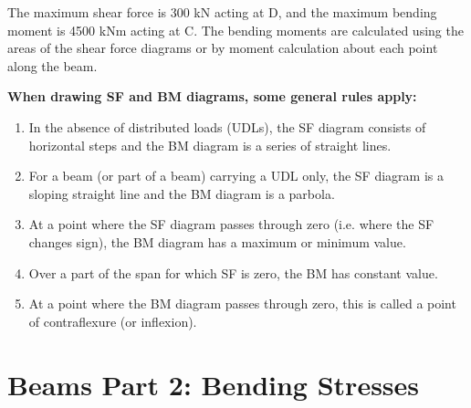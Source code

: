 \documentclass[12pt, letterpaper, twoside]{article}
\begin{document}
\begin{center}
\end{center}

\bigskip

The maximum shear force is 300 kN acting at D, and the maximum bending moment is 4500 kNm acting at C.  The bending moments are calculated using the areas of the shear force diagrams or by moment calculation about each point along the beam.
\bigskip

\textbf{When drawing SF and BM diagrams, some general rules apply:}

\begin{enumerate}
	\item In the absence of distributed loads (UDLs), the SF diagram consists of horizontal steps and the BM diagram is a series of straight lines.
	\item For a beam (or part of a beam) carrying a UDL only, the SF diagram is a sloping straight line and the BM diagram is a parbola.
	\item At a point where the SF diagram passes through zero (i.e. where the SF changes sign), the BM diagram has a maximum or minimum value.
	\item Over a part of the span for which SF is zero, the BM has constant value.
	\item At a point where the BM diagram passes through zero, this is called a point of contraflexure (or inflexion).
\end{enumerate}
\bigskip

\newpage
\section{Beams Part 2: Bending Stresses}
\end{document}
